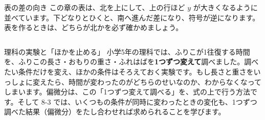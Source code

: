 \begin{tsumazuki}{表の差の向き}
この章の表は、北を上にして、上の行ほど $y$ が大きくなるように並べています。下どなりとひくと、南へ進んだ差になり、符号が逆になります。表を作るときは、どちらが北かを必ず確かめましょう。
\end{tsumazuki}

\begin{column}{理科の実験と「ほかを止める」}
小学5年の理科では、ふりこが1往復する時間を、ふりこの長さ・おもりの重さ・ふれはばを\textbf{1つずつ変えて}調べました。調べたい条件だけを変え、ほかの条件はそろえておく実験です。もし長さと重さをいっしょに変えたら、時間が変わったのがどちらのせいなのか、わからなくなってしまいます。偏微分は、この「1つずつ変えて調べる」を、式の上で行う方法です。そして 8-3 では、いくつもの条件が同時に変わったときの変化も、1つずつ調べた結果（偏微分）をたし合わせれば求められることを学びます。
\end{column}

